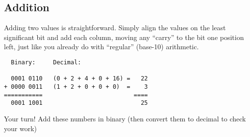 
\bigskip

\subsection*{Addition}

Adding two values is straightforward. Simply align the values on the least significant bit and add each column, moving any ``carry'' to the bit one position left, just like you already do with ``regular'' (base-10) arithmetic. %

\begin{verbatim}
  Binary:     Decimal:
   
  0001 0110   (0 + 2 + 4 + 0 + 16) =   22
+ 0000 0011   (1 + 2 + 0 + 0 + 0)  =    3
===========                          ====
  0001 1001                            25
\end{verbatim}


\bigskip

\noindent Your turn! Add these numbers in binary (then convert them to decimal to check your work)

\bigskip

